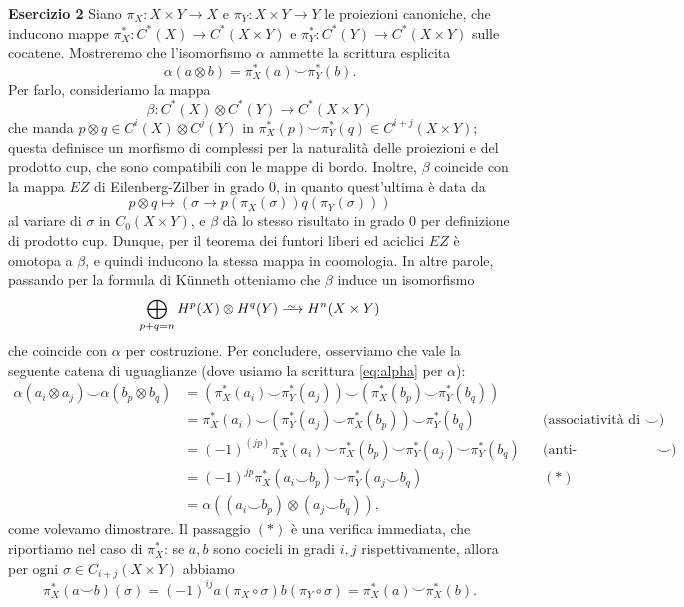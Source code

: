 \documentclass[a4paper]{article}
\newcommand\Iso{\xrightarrow{
                \,\smash{\raisebox{-0.65ex}{\ensuremath{\scriptstyle\sim}}}\,}}
\theoremstyle{definition}
\theoremstyle{definition}
\theoremstyle{remark}
\theoremstyle{definition}
\begin{document}
\textbf{Esercizio 2}
Siano $\pi_X:X\times Y\to X$ e $\pi_Y:X\times Y\to Y$ le proiezioni canoniche, che inducono mappe $\pi_X^*:C^*(X)\to C^*(X\times Y)$ e $\pi_Y^*:C^*(Y)\to C^*(X\times Y)$ sulle
cocatene. Mostreremo che l'isomorfismo $\alpha$ ammette la scrittura esplicita
\begin{equation}\label{eq:alpha}
    \alpha(a\otimes b) = \pi_X^*(a)\smile\pi_Y^*(b).
\end{equation}
Per farlo, consideriamo la mappa
\[
        \beta: C^*(X)\otimes C^*(Y) \to  C^*(X\times Y)
\]
che manda $p\otimes q\in C^i(X)\otimes C^j(Y)$ in $\pi_X^*(p)\smile\pi_Y^*(q)\in C^{i+j}(X\times Y)$; questa definisce un morfismo di complessi per la naturalità delle proiezioni e
del prodotto cup, che sono compatibili con le mappe di bordo. Inoltre, $\beta$ coincide con la mappa $EZ$ di Eilenberg-Zilber in grado $0$, in quanto quest'ultima è data da $$p\otimes
q\mapsto (\sigma\to p(\pi_X(\sigma))q(\pi_Y(\sigma)))$$ al variare di $\sigma$ in $C_0(X\times Y)$, e $\beta$ dà lo stesso risultato in grado $0$ per definizione di prodotto cup. Dunque, per
il teorema dei funtori liberi ed aciclici $EZ$ è omotopa a $\beta$, e quindi inducono la stessa mappa in coomologia. In altre parole, passando per la formula di Künneth otteniamo
che $\beta$ induce un isomorfismo
\[
    \bigoplus_{p+q=n} H^p(X)\otimes H^q(Y) \Iso H^n(X\times Y)
\]
che coincide con $\alpha$ per costruzione.
Per concludere, osserviamo che vale la seguente catena di uguaglianze (dove usiamo la scrittura \eqref{eq:alpha} per $\alpha$):
\begin{align*}
    \alpha(a_i\otimes a_j)\smile\alpha(b_p \otimes b_q) &= (\pi_X^*(a_i)\smile\pi_Y^*(a_j))\smile(\pi_X^*(b_p)\smile\pi_Y^*(b_q))\\
                                                        &= \pi_X^*(a_i)\smile(\pi_Y^*(a_j)\smile\pi_X^*(b_p))\smile\pi_Y^*(b_q) && \text{(associatività di $\smile$)}\\
                                                        &= (-1)^{(jp)}\pi_X^*(a_i)\smile  \pi_X^*(b_p)\smile\pi_Y^*(a_j)\smile\pi_Y^*(b_q) && \text{(anti-commutatività di $\smile$)}\\
                                                        &= (-1)^{jp}\pi_X^*(a_i\smile b_p)\smile\pi_Y^*(a_j\smile b_q) && (\ast)\\
                                                        &= \alpha((a_i\smile b_p)\otimes (a_j\smile b_q)),
\end{align*}
come volevamo dimostrare. Il passaggio $(\ast)$ è una verifica immediata, che riportiamo nel caso di $\pi_X^*$: se $a,b$ sono cocicli in gradi $i,j$ rispettivamente, allora per
ogni $\sigma\in C_{i+j}(X\times Y)$ abbiamo
\[
    \pi_X^*(a\smile b)(\sigma) = (-1)^{ij} a(\pi_X\circ \sigma)b(\pi_Y\circ \sigma) = \pi_X^*(a)\smile\pi_X^*(b)
.\]
\end{document}
